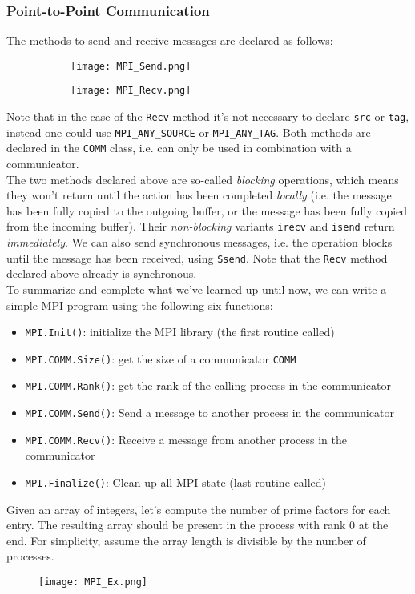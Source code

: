 \documentclass[main]{subfiles}
\begin{document}
\subsubsection{Point-to-Point Communication}
The methods to send and receive messages are declared as follows:
\begin{figure}[H]
    \centering
    \begin{subfigure}{.5\textwidth}
        \centering
        \texttt{[image: MPI\_Send.png]}
    \end{subfigure}%
    \begin{subfigure}{.5\textwidth}
        \centering
        \texttt{[image: MPI\_Recv.png]}
    \end{subfigure}
\end{figure}
Note that in the case of the \texttt{Recv} method it's not necessary to declare \texttt{src} or \texttt{tag}, instead one could use \texttt{MPI\_ANY\_SOURCE} or \texttt{MPI\_ANY\_TAG}. Both methods are declared in the \texttt{COMM} class, i.e. can only be used in combination with a communicator.\\[3mm]
The two methods declared above are so-called \textit{blocking} operations, which means they won't return until the action has been completed \textit{locally} (i.e. the message has been fully copied to the outgoing buffer, or the message has been fully copied from the incoming buffer). Their \textit{non-blocking} variants \texttt{irecv} and \texttt{isend} return \textit{immediately}. We can also send synchronous messages, i.e. the operation blocks until the message has been received, using \texttt{Ssend}. Note that the \texttt{Recv} method declared above already is synchronous.\\[3mm]
To summarize and complete what we've learned up until now, we can write a simple MPI program using the following six functions:
\begin{itemize}
    \item \texttt{MPI.Init()}: initialize the MPI library (the first routine called)
    \item \texttt{MPI.COMM.Size()}: get the size of a communicator \texttt{COMM}
    \item \texttt{MPI.COMM.Rank()}: get the rank of the calling process in the communicator
    \item \texttt{MPI.COMM.Send()}: Send a message to another process in the communicator
    \item \texttt{MPI.COMM.Recv()}: Receive a message from another process in the communicator
    \item \texttt{MPI.Finalize()}: Clean up all MPI state (last routine called)
\end{itemize}
\begin{example}
    Given an array of integers, let's compute the number of prime factors for each entry. The resulting array should be present in the process with rank 0 at the end. For simplicity, assume the array length is divisible by the number of processes.
    \begin{figure}[H]
        \centering
        \texttt{[image: MPI\_Ex.png]}
    \end{figure}
\end{example}
\end{document}
